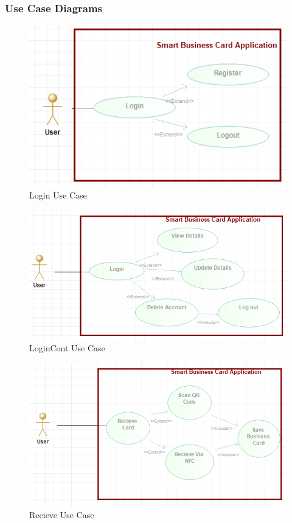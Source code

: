 \documentclass[english]{article}
\begin{document}
					\subsubsection{Use Case Diagrams}
					\begin{figure}[h]
						\includegraphics[width=\linewidth]{../UseCaseDiagrams/LoginUseCase.png}
						\caption{Login Use Case}
						\label{fig:Login}
					\end{figure}
					\begin{figure}
						\includegraphics[width=\linewidth]{../UseCaseDiagrams/LoginContUseCase.png}
						\caption{LoginCont Use Case}
						\label{fig:LoginCont}
					\end{figure}
					\begin{figure}
						\includegraphics[width=\linewidth]{../UseCaseDiagrams/RecieveUseCase.png}
						\caption{Recieve Use Case}
						\label{fig:Recieve}
					\end{figure}
\end{document}
